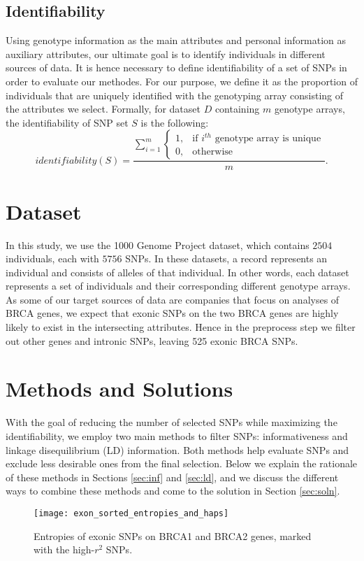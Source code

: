 \documentclass[14pt, oneside]{article}   	%
\begin{document}
\subsection{Identifiability}
Using genotype information as the main attributes and personal information as auxiliary attributes,
our ultimate goal is to identify individuals in different sources of data.
It is hence necessary to define identifiability of a set of SNPs in order to evaluate our methodes.
For our purpose, we define it as the proportion of individuals
that are uniquely identified with the genotyping array consisting of the attributes we select.
Formally, for dataset $D$ containing $m$ genotype arrays, the identifiability of SNP set $S$ is the following:
\[
identifiability(S) = \frac{\sum\limits_{i = 1}^{m}
\begin{cases}
1, & \text{if } i^{th} \text{ genotype array is unique}\\
0, & \text{otherwise}
\end{cases}
}
{m} .
\]
%
\section{Dataset}
In this study, we use the 1000 Genome Project dataset, which contains $2504$ individuals, each with $5756$ SNPs.
In these datasets, a record represents an individual and consists of alleles of that individual.
In other words, each dataset represents a set of individuals and their corresponding different genotype arrays.
As some of our target sources of data are companies that focus on analyses of BRCA genes,
we expect that exonic SNPs on the two BRCA genes are highly likely to exist in the intersecting attributes.
Hence in the preprocess step we filter out other genes and intronic SNPs, leaving 525 exonic BRCA SNPs.

\section{Methods and Solutions}\label{sec:app_and_soln}
With the goal of reducing the number of selected SNPs while maximizing the identifiability,
we employ two main methods to filter SNPs: informativeness and linkage disequilibrium (LD) information.
Both methods help evaluate SNPs and exclude less desirable ones from the final selection.
Below we explain the rationale of these methods in Sections \ref{sec:inf} and \ref{sec:ld},
and we discuss the different ways to combine these methods and come to the solution in Section \ref{sec:soln}.
\begin{figure}[t]
\centering
\texttt{[image: exon\_sorted\_entropies\_and\_haps]}
\caption{Entropies of exonic SNPs on BRCA1 and BRCA2 genes, marked with the high-$r^2$ SNPs.}
\label{fig:ents_haps}
\end{figure}
\end{document}
